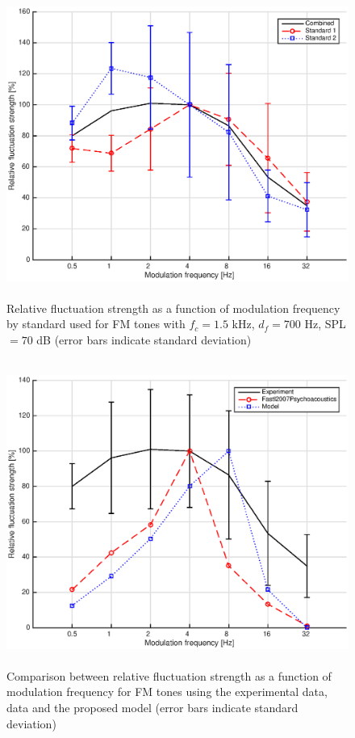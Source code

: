 \documentclass[a4paper]{article}
\begin{document}
\begin{figure}[ht!]
    \centering
    \includegraphics[height=10cm]{img/FM_tones-fm-results-All-standards}
    \caption{Relative fluctuation strength as a function of modulation
        frequency by standard used for FM tones with $f_c = 1.5$ kHz,
        $d_f = 700$ Hz, SPL $= 70$ dB (error bars indicate standard deviation)}
    \label{fig:fmstds}
\end{figure}

\begin{figure}[ht!]
    \centering
    \includegraphics[height=10cm]{img/FM_tones-fm-results-All-comparison}
    \caption{Comparison between relative fluctuation strength as a function of
        modulation frequency for FM tones using the experimental data,
        \citeauthor{Fastl2007Psychoacoustics} data and the proposed model
        (error bars indicate standard deviation)}
    \label{fig:fmcomp}
\end{figure}
\end{document}

